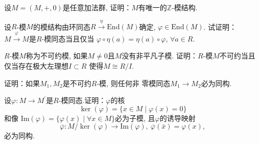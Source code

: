 \begin{problem}
    设$M = (M, +, 0)$是任意加法群, 证明：$M$有唯一的$\mathbb{Z}$-模结构.
\end{problem}

\begin{solution}
    
\end{solution}

\begin{problem}
    设$R$-模$M$的模结构由环同态$R \xrightarrow{\eta} \mathrm{End}(M)$确定, 
$\varphi \in \mathrm{End}(M)$. 试证明：
$M \xrightarrow{\varphi} M$是$R$-模同态当且仅当
$\varphi \circ \eta (a) = \eta (a) \circ \varphi$, $\forall a \in R$.
\end{problem}

\begin{solution}
    
\end{solution}

\begin{problem}
    $R$-模$M$称为不可约模, 如果$M \neq 0$且$M$没有非平凡子模.
证明：$R$-模$M$不可约当且仅当存在极大左理想$I \subset R$
使得$M \cong R/I$.
\end{problem}

\begin{solution}
    
\end{solution}

\begin{problem}[舒尔(Schur)引理]
    证明：如果$M_1, M_2$是不可约$R$-模, 则任何非
零模同态$M_1 \to M_2$必为同构.
\end{problem}

\begin{solution}
    
\end{solution}

\begin{problem}[同态基本定理]
    设$\varphi:M\to M^{\prime}$是$R$-模同态.证明：$\varphi$的核
\[
    \ker(\varphi) = \{x \in M \mid \varphi(x) = 0\}
\]
和像 $\mathrm{Im}(\varphi) = \{\varphi(x) \mid \forall x \in M\}$必为子模, 
且$\varphi$的诱导映射
\[
    \overline{\varphi}:M/\ker(\varphi) \to \mathrm{Im}(\varphi),\: \overline{\varphi}(\bar{x}) = \varphi(x),
\]
必为同构.
\end{problem}

\begin{solution}
    
\end{solution}